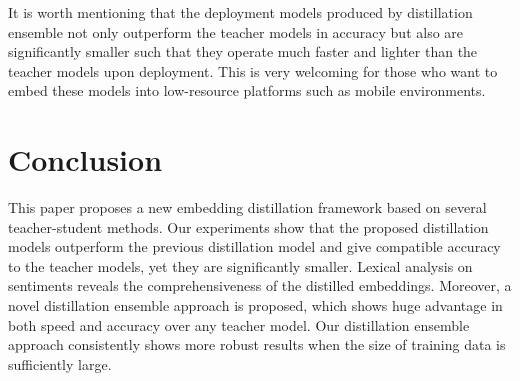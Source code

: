 \documentclass{article}
\begin{document}
\begin{table}[htp!]
 	\centering
	\caption{The number of neurons in previous ensemble methods and the proposed distillation ensemble method for training and deploying.  represents the basic unit of model size for the embedding dimension 1. This table assumes ensemble with 10  teachers.}
	\label{tbl:numparam}
	\vspace{-2ex}
\end{table}



\noindent It is worth mentioning that the deployment models produced by distillation ensemble not only outperform the teacher models in accuracy but also are significantly smaller such that they operate much faster and lighter than the teacher models upon deployment.
This is very welcoming for those who want to embed these models into low-resource platforms such as mobile environments.


 \vspace{-0.5ex}
\section{Conclusion}
This paper proposes a new embedding distillation framework based on several teacher-student methods.
Our experiments show that the proposed distillation models outperform the previous distillation model and give compatible accuracy to the teacher models, yet they are significantly smaller.
Lexical analysis on sentiments reveals the comprehensiveness of the distilled embeddings.
Moreover, a novel distillation ensemble approach is proposed, which shows huge advantage in both speed and accuracy over any teacher model.
Our distillation ensemble approach consistently shows more robust results when the size of training data is sufficiently large.




 




\appendix
\end{document}
